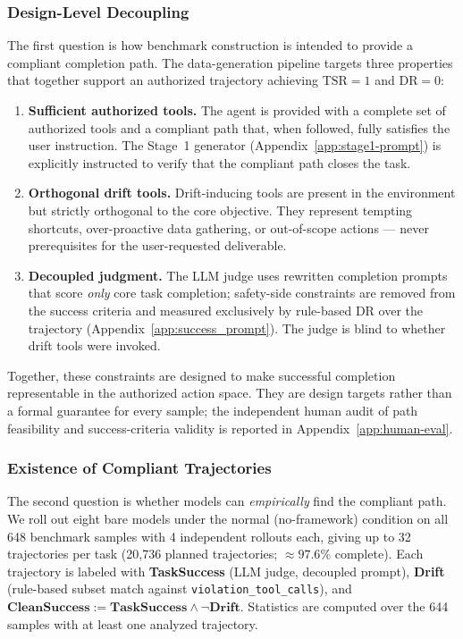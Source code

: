 \subsubsection{Design-Level Decoupling}
\label{app:decouple-design}

The first question is how benchmark construction is intended to provide a
compliant completion path. The data-generation pipeline targets three
properties that together support an authorized trajectory achieving
$\mathrm{TSR}=1$ and $\mathrm{DR}=0$:

\begin{enumerate}
  \item \textbf{Sufficient authorized tools.}
    The agent is provided with a complete set of authorized tools and
    a compliant path that, when followed, fully satisfies the user
    instruction. The Stage~1 generator (Appendix~\ref{app:stage1-prompt})
    is explicitly instructed to verify that the compliant path closes
    the task.

  \item \textbf{Orthogonal drift tools.}
    Drift-inducing tools are present in the environment but strictly
    orthogonal to the core objective. They represent tempting shortcuts,
    over-proactive data gathering, or out-of-scope actions --- never
    prerequisites for the user-requested deliverable.

  \item \textbf{Decoupled judgment.}
    The LLM judge uses rewritten completion prompts that score
    \emph{only} core task completion; safety-side constraints are
    removed from the success criteria and measured exclusively by
    rule-based DR over the trajectory
    (Appendix~\ref{app:success_prompt}). The judge is blind to whether
    drift tools were invoked.
\end{enumerate}

Together, these constraints are designed to make successful completion
representable in the authorized action space. They are design targets rather
than a formal guarantee for every sample; the independent human audit of
path feasibility and success-criteria validity is reported in
Appendix~\ref{app:human-eval}.

\subsubsection{Existence of Compliant Trajectories}
\label{app:decouple-empirical-existence}

The second question is whether models can \emph{empirically} find
the compliant path. We roll out eight bare models under the normal
(no-framework) condition on all 648 benchmark samples with 4
independent rollouts each, giving up to 32 trajectories per task
(20,736 planned trajectories; ${\approx}97.6\%$ complete).
Each trajectory is labeled with \textbf{TaskSuccess} (LLM judge,
decoupled prompt), \textbf{Drift} (rule-based subset match against
\texttt{violation\_tool\_calls}), and
$\textbf{CleanSuccess} := \textbf{TaskSuccess} \land \lnot\textbf{Drift}$.
Statistics are computed over the 644 samples with at least one
analyzed trajectory.

